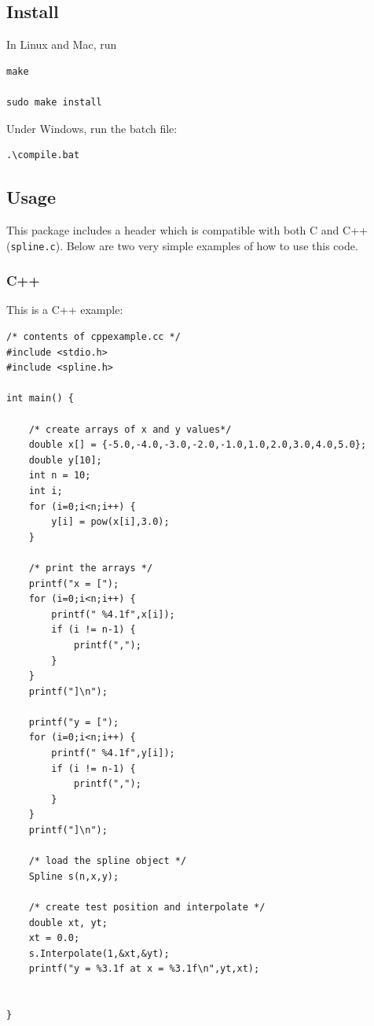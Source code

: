 \subsection{Install}

In Linux and Mac, run

\begin{verbatim}
make

sudo make install
\end{verbatim}

Under Windows, run the batch file:

\begin{verbatim}
.\compile.bat
\end{verbatim}

\subsection{Usage}

This package includes a header which is compatible with both C and C++ (\texttt{spline.c}). Below are two very simple examples of how to use this code.

\subsubsection{C++}

This is a C++ example:

\begin{verbatim}
/* contents of cppexample.cc */
#include <stdio.h>
#include <spline.h>

int main() {

	/* create arrays of x and y values*/
	double x[] = {-5.0,-4.0,-3.0,-2.0,-1.0,1.0,2.0,3.0,4.0,5.0};
	double y[10];
	int n = 10;
	int i;
	for (i=0;i<n;i++) {
		y[i] = pow(x[i],3.0);
	}

	/* print the arrays */
	printf("x = [");
	for (i=0;i<n;i++) {
		printf(" %4.1f",x[i]);
		if (i != n-1) {
			printf(",");
		}
	}
	printf("]\n");

	printf("y = [");
	for (i=0;i<n;i++) {
		printf(" %4.1f",y[i]);
		if (i != n-1) {
			printf(",");
		}
	}
	printf("]\n");

	/* load the spline object */
	Spline s(n,x,y);

	/* create test position and interpolate */
	double xt, yt;
	xt = 0.0;
	s.Interpolate(1,&xt,&yt);
	printf("y = %3.1f at x = %3.1f\n",yt,xt);


}
\end{verbatim}

